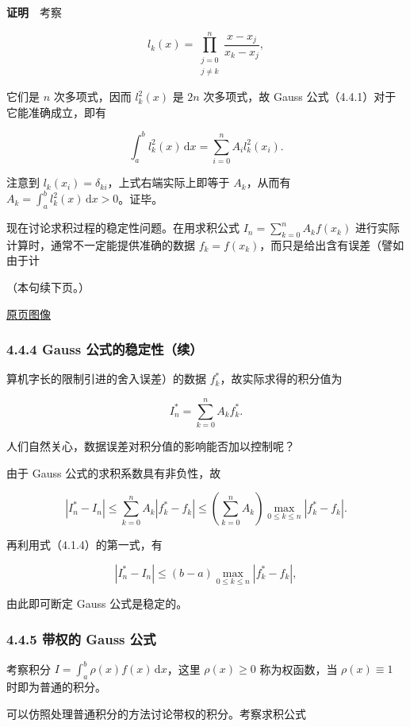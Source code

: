\documentclass[
  10pt,
  fontset=fandol]{ctexart}
\begin{document}
\textbf{证明}　考察

\[
l_k(x)=\prod_{\substack{j=0\\j\ne k}}^{n}\frac{x-x_j}{x_k-x_j},
\]

它们是 \(n\) 次多项式，因而 \(l_k^2(x)\) 是 \(2n\) 次多项式，故 Gauss 公式（4.4.1）对于它能准确成立，即有

\[
\int_a^b l_k^2(x)\,\mathrm{d}x=\sum_{i=0}^{n}A_i l_k^2(x_i).
\]

注意到 \(l_k(x_i)=\delta_{ki}\)，上式右端实际上即等于 \(A_k\)，从而有 \(\displaystyle A_k=\int_a^b l_k^2(x)\,\mathrm{d}x>0\)。证毕。

现在讨论求积过程的稳定性问题。在用求积公式 \(\displaystyle I_n=\sum_{k=0}^{n}A_kf(x_k)\) 进行实际计算时，通常不一定能提供准确的数据 \(f_k=f(x_k)\)，而只是给出含有误差（譬如由于计

（本句续下页。）

\href{../../source-images/pdf-110.jpeg}{原页图像}

\subsubsection{4.4.4 Gauss 公式的稳定性（续）}\label{gauss-ux516cux5f0fux7684ux7a33ux5b9aux6027ux7eed}

算机字长的限制引进的舍入误差）的数据 \(f_k^*\)，故实际求得的积分值为

\[
I_n^*=\sum_{k=0}^{n}A_kf_k^*.
\]

人们自然关心，数据误差对积分值的影响能否加以控制呢？

由于 Gauss 公式的求积系数具有非负性，故

\[
|I_n^*-I_n|\leq\sum_{k=0}^{n}A_k|f_k^*-f_k|
\leq\left(\sum_{k=0}^{n}A_k\right)\max_{0\leq k\leq n}|f_k^*-f_k|.
\]

再利用式（4.1.4）的第一式，有

\[
|I_n^*-I_n|\leq(b-a)\max_{0\leq k\leq n}|f_k^*-f_k|,
\]

由此即可断定 Gauss 公式是稳定的。

\subsubsection{4.4.5 带权的 Gauss 公式}\label{ux5e26ux6743ux7684-gauss-ux516cux5f0f}

考察积分 \(\displaystyle I=\int_a^b\rho(x)f(x)\,\mathrm{d}x\)，这里 \(\rho(x)\geq0\) 称为权函数，当 \(\rho(x)\equiv1\) 时即为普通的积分。

可以仿照处理普通积分的方法讨论带权的积分。考察求积公式
\end{document}
